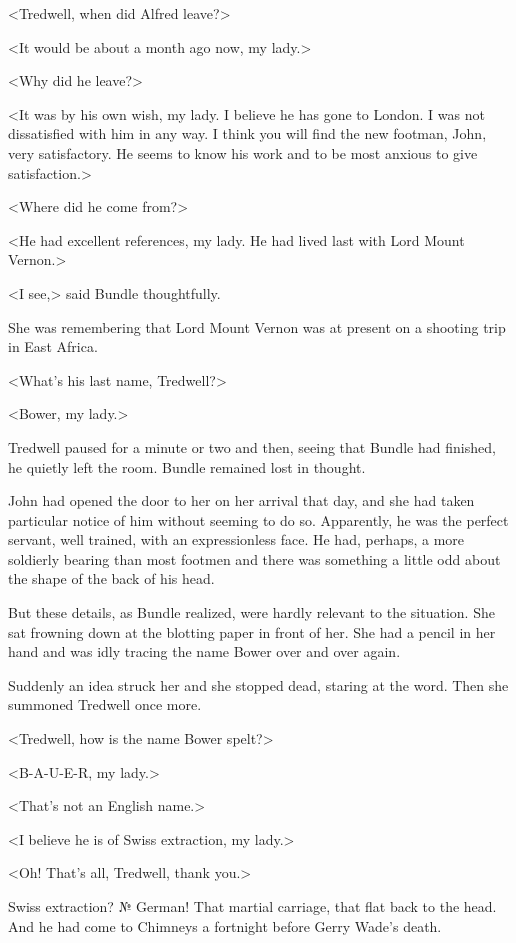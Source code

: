 <Tredwell, when did Alfred leave?>

<It would be about a month ago now, my lady.>

<Why did he leave?>

<It was by his own wish, my lady. I believe he has gone to London. I was not dissatisfied with him in any way. I think you will find the new footman, John, very satisfactory. He seems to know his work and to be most anxious to give satisfaction.>

<Where did he come from?>

<He had excellent references, my lady. He had lived last with Lord Mount Vernon.>

<I see,> said Bundle thoughtfully.

She was remembering that Lord Mount Vernon was at present on a shooting trip in East Africa.

<What's his last name, Tredwell?>

<Bower, my lady.>

Tredwell paused for a minute or two and then, seeing that Bundle had finished, he quietly left the room. Bundle remained lost in thought.

John had opened the door to her on her arrival that day, and she had taken particular notice of him without seeming to do so. Apparently, he was the perfect servant, well trained, with an expressionless face. He had, perhaps, a more soldierly bearing than most footmen and there was something a little odd about the shape of the back of his head.

But these details, as Bundle realized, were hardly relevant to the situation. She sat frowning down at the blotting paper in front of her. She had a pencil in her hand and was idly tracing the name Bower over and over again.

Suddenly an idea struck her and she stopped dead, staring at the word. Then she summoned Tredwell once more.

<Tredwell, how is the name Bower spelt?>

<B-A-U-E-R, my lady.>

<That's not an English name.>

<I believe he is of Swiss extraction, my lady.>

<Oh! That's all, Tredwell, thank you.>

Swiss extraction? № German! That martial carriage, that flat back to the head. And he had come to Chimneys a fortnight before Gerry Wade's death.

